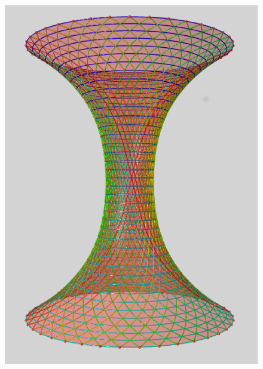 \documentclass {report}
\begin{document}
\begin{figure}[h!]
   \begin{minipage}[b]{0.30\linewidth}
      \centering \includegraphics[scale=0.2]{Images_Fichiers/7.eps}
     

\end{minipage}
\end{figure}
\end{document}
